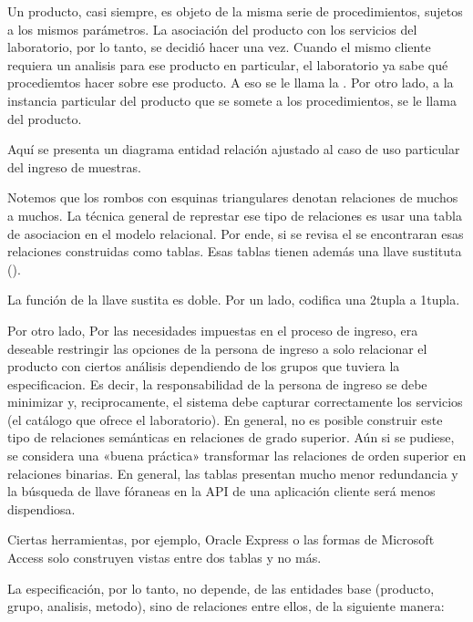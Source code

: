 \documentclass[letterpaper,10pt,spanish]{sphinxmanual}
\begin{document}
Un producto, casi siempre,  es objeto de la misma serie de procedimientos,
sujetos a los mismos parámetros. La asociación del producto con los servicios
del laboratorio, por lo tanto,  se decidió hacer una vez. Cuando el mismo
cliente requiera un analisis para ese producto en particular, el laboratorio
ya sabe qué procediemtos hacer sobre ese producto. A eso se le llama la
. Por otro lado, a la instancia particular
del producto que se somete a los procedimientos, se le llama  del producto.

Aquí se presenta un diagrama entidad relación ajustado al caso de uso particular
del ingreso de muestras.


Notemos que los rombos con esquinas triangulares denotan relaciones de
muchos a muchos.  La técnica general de represtar ese tipo de
relaciones es usar una tabla de asociacion en el modelo
relacional. Por ende, si se revisa el  se encontraran esas
relaciones construidas como tablas. Esas tablas tienen además una
llave sustituta ().

La función de la llave sustita es doble. Por un lado, codifica una
2\sphinxhyphen{}tupla a 1\sphinxhyphen{}tupla.

Por otro lado, Por las necesidades impuestas en el proceso de ingreso,
era deseable restringir las opciones de la persona de ingreso a solo
relacionar el producto con ciertos análisis dependiendo de los grupos
que tuviera la especificacion. Es decir, la responsabilidad de la
persona de ingreso se debe minimizar y, reciprocamente, el sistema
debe capturar correctamente los servicios (el catálogo que ofrece el
laboratorio). En general, no es posible construir este tipo de
relaciones semánticas en relaciones de grado superior. Aún si se
pudiese, se considera una «buena práctica» transformar las relaciones
de orden superior en relaciones binarias. En general, las tablas presentan
mucho menor redundancia  y la búsqueda de llave fóraneas en la API
de una aplicación cliente será menos dispendiosa.

Ciertas herramientas, por ejemplo,
Oracle Express o las formas de Microsoft Access solo construyen vistas entre
dos tablas y no más.

La especificación, por lo tanto, no depende, de las entidades base (producto, grupo, analisis, metodo),
sino de relaciones entre ellos, de la siguiente manera:
\end{document}
